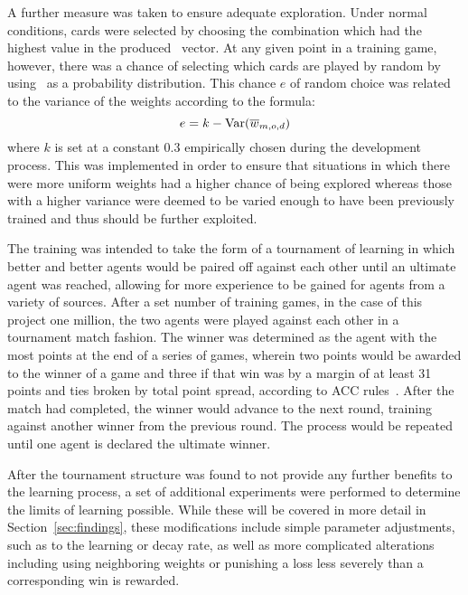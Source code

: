 \newcommand{\Var}{\mathrm{Var}}
A further measure was taken to ensure adequate exploration.
%
Under normal conditions,
cards were selected by choosing the combination which had the highest value in
the produced \pvec\ vector.
%
At any given point in a training game, however,
there was a chance of selecting which cards are played
by random by using \pvec\ as a probability distribution.
%
This chance $e$ of random choice was related to the variance of the 
weights according to the formula:
\[
	e = k - \Var(\wvecm_{m,o,d})
\]
where $k$ is set at a constant $0.3$ empirically chosen during the
development process.
%
This was implemented in order to ensure that situations in which there were
more uniform weights had a higher chance of being explored
whereas those with a higher variance were deemed to be varied enough to
have been previously trained
and thus should be further exploited.

The training was intended to take the form of a tournament of learning in which
better and better agents would be paired off against each other until an
ultimate agent was reached,
allowing for more experience to be gained for agents from a variety of sources.
%
After a set number of training games,
in the case of this project one million,
the two agents were played against each other in a tournament match fashion.
%
The winner was determined as the agent with the most points at the end
of a series of games, %
wherein two points would be awarded to the winner of a game and three if that
win was by a margin of at least 31 points
and ties broken by total point spread,
according to ACC rules~\cite{ACC_rules}.
%
After the match had completed,
the winner would advance to the next round,
training against another winner from the previous round.
%
The process would be
repeated until one agent is declared the ultimate winner.

After the tournament structure was found to not provide any further benefits
to the learning process,
a set of additional experiments were performed to determine the limits of
learning possible.
%
While these will be covered in more detail in Section~\ref{sec:findings},
these modifications include simple
parameter adjustments, such as to the learning or decay rate,
as well as
more complicated alterations 
including using neighboring weights
or punishing a loss less severely than a corresponding win is rewarded.

